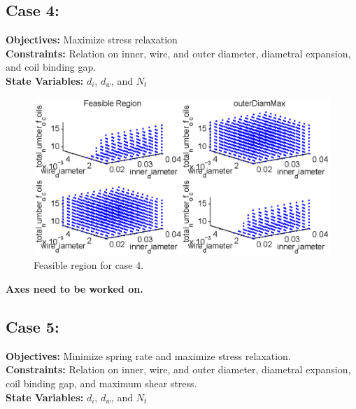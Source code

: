 \documentclass[10pt]{article}
\begin{document}
\newpage
\subsection{Case 4:}
\label{subsec:Case4} 

	
	\textbf{Objectives:} Maximize stress relaxation\\
	\textbf{Constraints:} Relation on inner, wire, and outer diameter, diametral expansion, and coil binding gap. \\
	\textbf{State Variables:} $d_{i}$, $d_{w}$, and $N_{t}$ \\



		\begin{figure}[h]
		 \begin{center}\includegraphics[scale=.75]{Case_11_348.eps}\end{center}
		 \caption{Feasible region for case 4.}
		 \label{Feasible Case 4}
		 
		 \end{figure}
 		\textbf{Axes need to be worked on.}

\newpage
\subsection{Case 5:}
\label{subsec:Case5}

	\textbf{Objectives:} Minimize spring rate and maximize stress relaxation.\\
	\textbf{Constraints:}  Relation on inner, wire, and outer diameter, diametral expansion, coil binding gap, and maximum shear stress. \\
		\textbf{State Variables:} $d_{i}$, $d_{w}$, and $N_{t}$ \\
		
\end{document}
